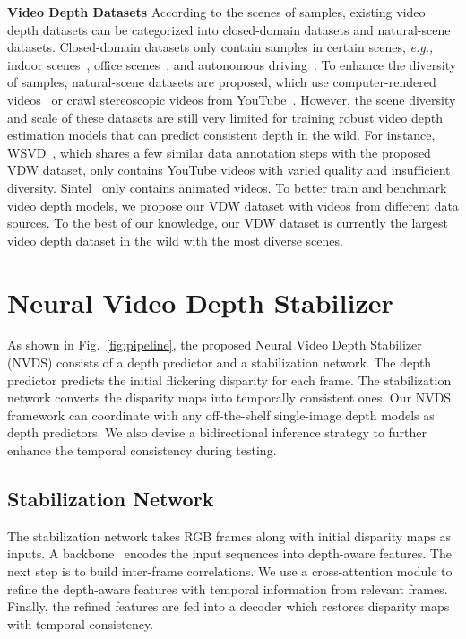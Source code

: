 \documentclass[10pt,twocolumn,letterpaper]{article}
\def\framework{Neural Video Depth Stabilizer}
\def\sx{NVDS}
\def\SbN{Stabilization Network}
\def\sbn{stabilization network}
\def\data{VDW}
\def\reffig{Fig.}
\begin{document}
\noindent\textbf{Video Depth Datasets} According to the scenes of samples, existing video depth datasets can be categorized into closed-domain datasets and natural-scene datasets. Closed-domain datasets only contain samples in certain scenes, \textit{e.g.,} indoor scenes~\cite{nyu,scannet,irs}, office scenes~\cite{tum}, and autonomous driving~\cite{kitti}. To enhance the diversity of samples, natural-scene datasets are proposed, which use computer-rendered videos~\cite{sintel,tata} or crawl stereoscopic videos from YouTube~\cite{wsvd}. However, the scene diversity and scale of these datasets are still very limited for training robust video depth estimation models that can predict consistent depth in the wild. For instance, WSVD~\cite{wsvd}, which shares a few similar data annotation steps with the proposed \data{} dataset, only contains  YouTube videos with varied quality and insufficient diversity. Sintel~\cite{sintel} only contains  animated videos. To better train and benchmark video depth models, we propose our \data{} dataset with  videos from  different data sources. To the best of our knowledge, our \data{} dataset is currently the largest video depth dataset in the wild with the most diverse scenes.


\section{\framework{}}



As shown in \reffig{}~\ref{fig:pipeline}, the proposed \framework{} (\sx{}) consists of a depth predictor and a \sbn{}. The depth predictor predicts the initial flickering disparity for each frame. The \sbn{} converts the disparity maps into temporally consistent ones. Our \sx{} framework can coordinate with any off-the-shelf single-image depth models as depth predictors. We also devise a bidirectional inference strategy to further enhance the temporal consistency during testing. 

\subsection{\SbN{}}
The \sbn{} takes RGB frames along with initial disparity maps as inputs. A backbone~\cite{segformer} encodes the input sequences into depth-aware features. The next step is to build inter-frame correlations. We use a cross-attention module to refine the depth-aware features with temporal information from relevant frames.
Finally, the refined features are fed into a decoder which restores disparity maps with temporal consistency.
\end{document}
